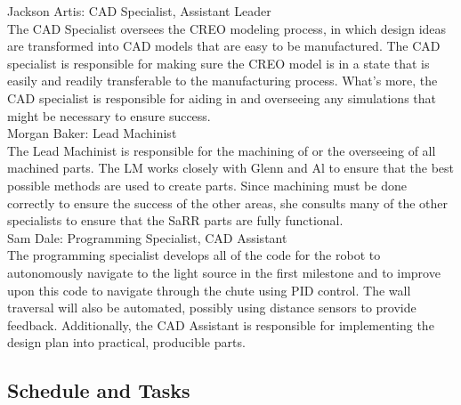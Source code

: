 \documentclass[12pt]{article}
\begin{document}
Jackson Artis: CAD Specialist, Assistant Leader\\
    
    The CAD Specialist oversees the CREO modeling process, in which design ideas are transformed into CAD models that are easy to be manufactured. The CAD specialist is responsible for making sure the CREO model is in a state that is easily and readily transferable to the manufacturing process. What's more, the CAD specialist is responsible for aiding in and overseeing any simulations that might be necessary to ensure success. \\ 

Morgan Baker: Lead Machinist\\

    The Lead Machinist is responsible for the machining of or the overseeing of all machined parts. The LM works closely with Glenn and Al to ensure that the best possible methods are used to create parts. Since machining must be done correctly to ensure the success of the other areas, she consults many of the other specialists to ensure that the SaRR parts are fully functional.\\
    
Sam Dale: Programming Specialist, CAD Assistant\\

    The programming specialist develops all of the code for the robot to autonomously navigate to the light source in the first milestone and to improve upon this code to navigate through the chute using PID control. The wall traversal will also be automated, possibly using distance sensors to provide feedback. Additionally, the CAD Assistant is responsible for implementing the design plan into practical, producible parts. 
    

\subsection{Schedule and Tasks}
\end{document}
